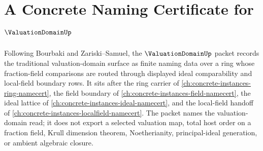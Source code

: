 \chapter{A Concrete Naming Certificate for $\ValuationDomainUp$}
\label{ch:concrete-instances-valuation-domain-namecert}

Following Bourbaki and Zariski--Samuel, the $\ValuationDomainUp$ packet records the traditional valuation-domain surface as finite naming data over a ring whose fraction-field comparisons are routed through displayed ideal comparability and local-field boundary rows. It sits after the ring carrier of \autoref{ch:concrete-instances-ring-namecert}, the field boundary of \autoref{ch:concrete-instances-field-namecert}, the ideal lattice of \autoref{ch:concrete-instances-ideal-namecert}, and the local-field handoff of \autoref{ch:concrete-instances-localfield-namecert}. The packet names the valuation-domain read; it does not export a selected valuation map, total host order on a fraction field, Krull dimension theorem, Noetherianity, principal-ideal generation, or ambient algebraic closure.

